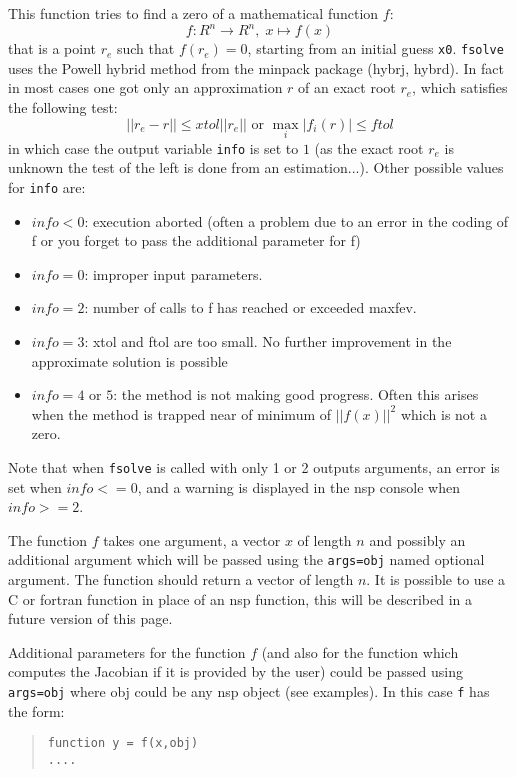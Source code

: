 \begin{mandescription}
This function tries to find a zero of a mathematical function $f$:
$$
    f: R^n \rightarrow  R^n, \; x \longmapsto f(x)
$$
that is a point $r_e$ such that $f(r_e)=0$, starting from an initial guess \verb+x0+.
\verb+fsolve+ uses the Powell hybrid method from the minpack package (hybrj, hybrd). 
In fact in most cases one got only an approximation $r$ of an exact root $r_e$,  
which satisfies the following test:  
$$
|| r_e - r || \le xtol || r_e || \mbox{ or } \max_i | f_i(r) | \le ftol
$$
in which case the output variable \verb+info+ is set to $1$ (as the exact root  $r_e$
is unknown the test of the left is done from an estimation...). Other possible values
for \verb+info+ are:
\begin{itemize}
\item $info<0$: execution aborted (often a problem due to an error in the coding of f or you forget
               to pass the additional parameter for f)
\item $info=0$: improper input parameters.
\item $info=2$: number of calls to f has reached or exceeded maxfev.
\item $info=3$: xtol and ftol are too small. No further improvement in the approximate solution is possible
\item $info=4$ or $5$: the method is not making good progress. Often this arises when the method
             is trapped near of minimum of $||f(x)||^2$ which is not a zero.
\end{itemize}
Note that when \verb+fsolve+ is called with only 1 or 2 outputs arguments, an error is set 
when $info <= 0$, and a warning is displayed in the nsp console when $info >= 2$. 

The function $f$ takes one argument, a vector $x$ of length $n$ and possibly an additional
argument which will be passed using the \verb+args=obj+ named optional argument. The function
should return a vector of length $n$. It is possible to use a C or fortran function in place
of an nsp function, this will be described in a future version of this page.

Additional parameters for the function $f$ (and also for the function which computes the Jacobian 
if it is provided by the user) could be passed using \verb+args=obj+ where obj could be any nsp 
object (see examples). In this case \verb+f+ has the form:
\begin{quote}
{\tt function y = f(x,obj) \\
      ....}
\end{quote}


\end{mandescription}
